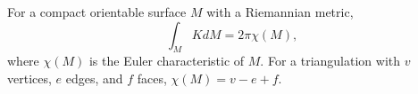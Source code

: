 For a compact orientable surface $M$ with a Riemannian metric,
$$\int_M K dM = 2\pi \chi(M),$$
where $\chi(M)$ is the Euler characteristic of $M$. For a triangulation with $v$ vertices, $e$ edges, and $f$ faces, $\chi(M) = v - e + f$.